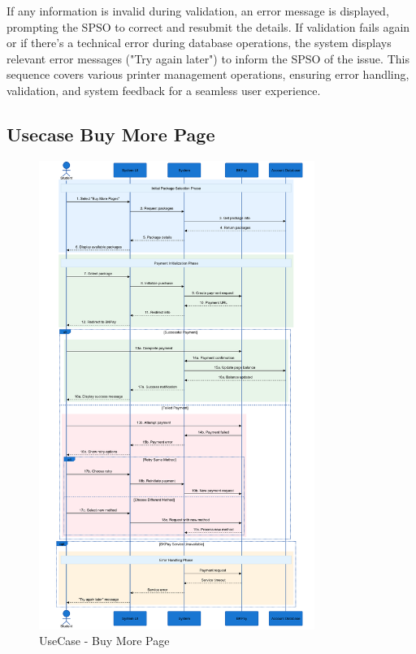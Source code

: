 \documentclass[a4paper]{report}
\begin{document}
If any information is invalid during validation, an error message is displayed, prompting the SPSO to correct and resubmit the details. If validation fails again or if there's a technical error during database operations, the system displays relevant error messages ("Try again later") to inform the SPSO of the issue. This sequence covers various printer management operations, ensuring error handling, validation, and system feedback for a seamless user experience.


\subsection{Usecase Buy More Page}

\begin{figure}[H]
    \centering
    \includegraphics[width=0.8\textwidth]{images/sequence_diagram/Buy More Pages.png}
    \caption{UseCase - Buy More Page}
    \label{fig:buy_more_page}
\end{figure}
\end{document}
